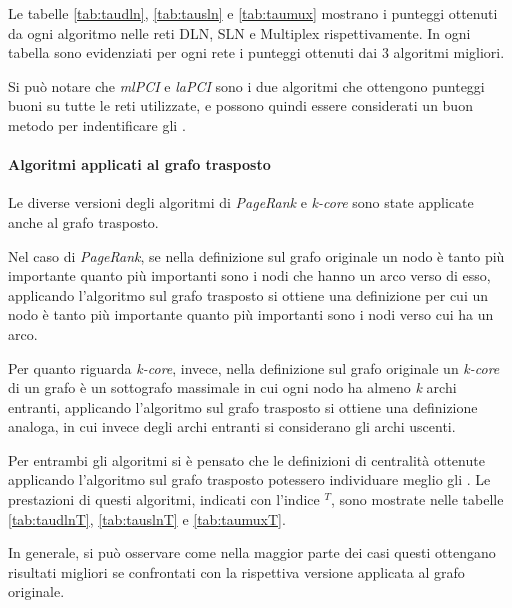 Le tabelle \ref{tab:taudln}, \ref{tab:tausln} e \ref{tab:taumux} mostrano i punteggi 
ottenuti da ogni algoritmo nelle reti DLN, SLN e Multiplex rispettivamente.
In ogni tabella sono evidenziati per ogni rete i punteggi ottenuti dai \num{3} algoritmi 
migliori. 

Si può notare che \textit{mlPCI} e \textit{laPCI} sono i due algoritmi che ottengono punteggi buoni 
su tutte le reti utilizzate, e possono quindi essere considerati un buon metodo per indentificare 
gli \infsp.





\paragraph{Algoritmi applicati al grafo trasposto}
Le diverse versioni degli algoritmi di \textit{PageRank} e \textit{k-core} sono state applicate anche al grafo trasposto.

Nel caso di \textit{PageRank}, se nella definizione sul grafo originale un nodo è tanto più importante quanto 
più importanti sono i nodi che hanno un arco verso di esso, applicando l'algoritmo sul grafo trasposto si ottiene
una definizione per cui un nodo è tanto più importante quanto più importanti sono i nodi verso cui ha un arco.

Per quanto riguarda \textit{k-core}, invece, nella definizione sul grafo originale un \textit{k-core} di un grafo è un sottografo 
massimale in cui ogni nodo ha almeno \textit{k} archi entranti, applicando l'algoritmo sul grafo trasposto si ottiene 
una definizione analoga, in cui invece degli archi entranti si considerano gli archi uscenti.

Per entrambi gli algoritmi si è pensato che le definizioni di centralità ottenute applicando l'algoritmo 
sul grafo trasposto potessero individuare meglio gli \infsp. Le prestazioni di questi algoritmi, indicati 
con l'indice $^T$, sono mostrate nelle tabelle \ref{tab:taudlnT}, \ref{tab:tauslnT} e \ref{tab:taumuxT}.

In generale, si può osservare come nella maggior parte dei casi questi ottengano risultati migliori se confrontati con 
la rispettiva versione applicata al grafo originale. 



